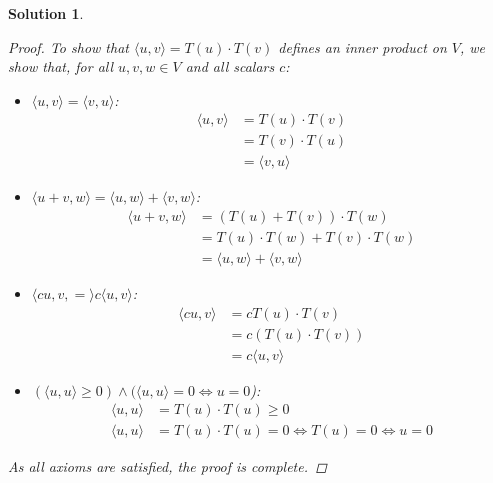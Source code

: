 \documentclass[11pt]{scrartcl}
\theoremstyle{dotlessP}
\newtheorem{sol}{Solution}[section]
\theoremstyle{dotlessN}
\newcommand{\ip}[2]{\langle #1, #2 \rangle}
\begin{document}
\begin{sol}
	\begin{proof}
		To show that $\ip{u}{v} = T(u) \cdot T(v)$ defines an inner product on $V$, we show that, for all $u,v,w \in V$ and all scalars $c$:
		\begin{itemize}
			\item $\ip{u}{v} = \ip{v}{u}$: 
				\begin{align*}
					\ip{u}{v} &= T(u) \cdot T(v) \\
							  &= T(v) \cdot T(u) \\
							  &= \ip{v}{u}
				\end{align*}
			\item $\ip{u+v}{w} = \ip{u}{w} + \ip{v}{w}$: 
				\begin{align*}
					\ip{u + v}{w} &= (T(u) + T(v))\cdot T(w) \\
								  &= T(u)\cdot T(w) + T(v)\cdot T(w) \\
								  &= \ip{u}{w} + \ip{v}{w}
				\end{align*}
			\item $\ip{cu, v} = c\ip{u}{v}$:
				\begin{align*}
					\ip{cu}{v} &= cT(u) \cdot T(v) \\
							   &= c(T(u) \cdot T(v)) \\
							   &= c\ip{u}{v} 
				\end{align*}
		\item $(\ip{u}{u} \geq 0) \land (\ip{u}{u} = 0 \iff u = 0$):
			\begin{align*}
				\ip{u}{u} &= T(u) \cdot T(u) \geq 0 \\
				\ip{u}{u} &= T(u) \cdot T(u) = 0 \iff T(u) = 0 \iff u = 0
			\end{align*}
		\end{itemize}
		As all axioms are satisfied, the proof is complete.
	\end{proof}
\end{sol}
\end{document}
